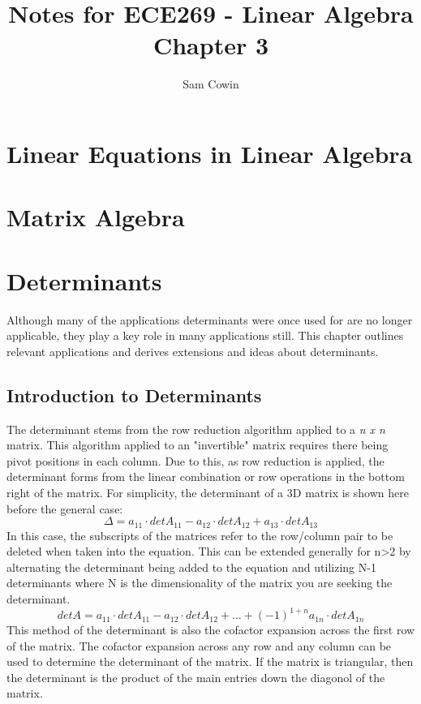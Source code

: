 \documentclass[12pt]{article}
\begin{document}
\setlength{\abovedisplayskip}{0pt}
\setlength{\belowdisplayskip}{0pt}
\setlength{\abovedisplayshortskip}{0pt}
\setlength{\belowdisplayshortskip}{0pt}

\title{Notes for ECE269 - Linear Algebra \\
\large Chapter 3}
\author{Sam Cowin}
\maketitle

\section{Linear Equations in Linear Algebra}
\section{Matrix Algebra}
\section{Determinants}
Although many of the applications determinants were once used for are no longer applicable, they play a key role in many applications still. This chapter outlines %
relevant applications and derives extensions and ideas about determinants. 
\subsection{Introduction to Determinants}
The determinant stems from the row reduction algorithm applied to a \textit{n x n} matrix. This algorithm applied to an "invertible" matrix requires there %
being pivot positions in each column. Due to this, as row reduction is applied, the determinant forms from the linear combination or row operations in the bottom right %
of the matrix. 
\newline
\newline
For simplicity, the determinant of a 3D matrix is shown here before the general case: 
\newline
$$
\Delta=a_{11}\cdot detA_{11}-a_{12}\cdot detA_{12}+a_{13}\cdot detA_{13}
$$
\newline
In this case, the subscripts of the matrices refer to the row/column pair to be deleted when taken into the equation. This can be extended generally for n>2 %
by alternating the determinant being added to the equation and utilizing N-1 determinants where N is the dimensionality of the matrix you are seeking the determinant. %
\newline
$$
detA=a_{11}\cdot detA_{11}-a_{12}\cdot detA_{12}+\dots+(-1)^{1+n}a_{1n}\cdot detA_{1n}
$$
\newline
This method of the determinant is also the cofactor expansion across the first row of the matrix. The cofactor expansion across any row and any column can be used to %
determine the determinant of the matrix. If the matrix is triangular, then the determinant is the product of the main entries down the diagonol of the matrix. 
\end{document}
